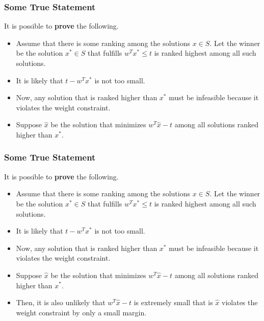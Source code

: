 \begin{frame}
    \frametitle{Some True Statement}

    It is possible to \textbf{prove} the following.

    \begin{itemize}
        \item Assume that there is some ranking among the solutions $x \in S$. Let the winner
              be the solution $x^{*} \in S$ that fulfills $w^T x^{*} \leq t$ is ranked
              highest among all such solutions.
        \item It is likely that $t - w^T x^{*}$ is not too small.
        \item Now, any solution that is ranked higher than $x^{*}$ must be infeasible because
              it violates the weight constraint.
        \item Suppose $\hat{x}$ be the solution that minimizes $w^T \hat{x} - t$ among all
              solutions ranked higher than $x^{*}$.
    \end{itemize}

\end{frame}

\begin{frame}
    \frametitle{Some True Statement}

    It is possible to \textbf{prove} the following.

    \begin{itemize}
        \item Assume that there is some ranking among the solutions $x \in S$. Let the winner
              be the solution $x^{*} \in S$ that fulfills $w^T x^{*} \leq t$ is ranked
              highest among all such solutions.
        \item It is likely that $t - w^T x^{*}$ is not too small.
        \item Now, any solution that is ranked higher than $x^{*}$ must be infeasible because
              it violates the weight constraint.
        \item Suppose $\hat{x}$ be the solution that minimizes $w^T \hat{x} - t$ among all
              solutions ranked higher than $x^{*}$.
        \item Then, it is also unlikely that $w^T \hat{x} - t$ is extremely small that is
              $\hat{x}$ violates the weight constraint by only a small margin.
    \end{itemize}

\end{frame}

